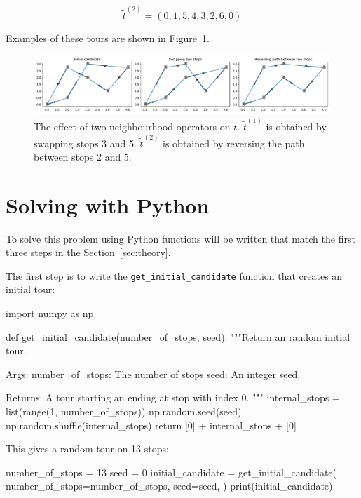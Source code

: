 \[
    \tilde t^{(2)} = (0, 1, 5, 4, 3, 2, 6, 0)
\]

Examples of these tours are shown in
Figure~\ref{fig:tsp-effect-of-neighbourhood-operators}.

\begin{figure}[!hbtp]
    \begin{center}
        \includegraphics[width=\textwidth]{./assets/tsp-effect-of-neighbourhood-operators/main.pdf}
    \end{center}
    \caption{The effect of two neighbourhood operators on \(t\). \(\tilde t^{(1)}\) is
    obtained by swapping stops 3 and 5. \(\tilde t^{(2)}\) is obtained by reversing the
    path between stops 2 and 5.}
    \label{fig:tsp-effect-of-neighbourhood-operators}
\end{figure}

\section{Solving with Python}\label{sec:solving-with-python}

To solve this problem using Python functions will be written that match the
first three steps in the Section~\ref{sec:theory}.

The first step is to write the \texttt{get_initial_candidate}
function that creates an initial tour:

\begin{pyin}
import numpy as np


def get_initial_candidate(number_of_stops, seed):
    """Return an random initial tour.

    Args:
        number_of_stops: The number of stops
        seed: An integer seed.

    Returns:
        A tour starting an ending at stop with index 0.
    """
    internal_stops = list(range(1, number_of_stops))
    np.random.seed(seed)
    np.random.shuffle(internal_stops)
    return [0] + internal_stops + [0]
\end{pyin}

This gives a random tour on 13 stops:

\begin{pyin}
number_of_stops = 13
seed = 0
initial_candidate = get_initial_candidate(
    number_of_stops=number_of_stops,
    seed=seed,
)
print(initial_candidate)
\end{pyin}

